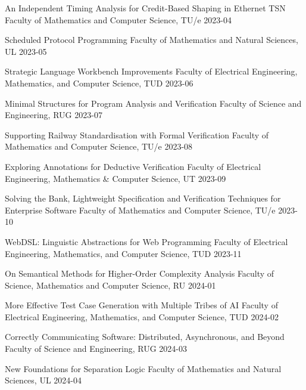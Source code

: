 \begin{multicols}{2}
         {An Independent Timing Analysis for Credit-Based Shaping in Ethernet TSN}
         {Faculty of Mathematics and Computer Science, TU/e}
         {2023-04}

         {Scheduled Protocol Programming}
         {Faculty of Mathematics and Natural Sciences, UL}
         {2023-05}

         {Strategic Language Workbench Improvements}
         {Faculty of Electrical Engineering, Mathematics, and Computer Science, TUD}
         {2023-06}

         {Minimal Structures for Program Analysis and Verification}
         {Faculty of Science and Engineering, RUG}
         {2023-07}

         {Supporting Railway Standardisation with Formal Verification}
         {Faculty of Mathematics and Computer Science, TU/e}
         {2023-08}

         {Exploring Annotations for Deductive Verification}
         {Faculty of Electrical Engineering, Mathematics \& Computer Science, UT}
         {2023-09}
		 
         {Solving the Bank, Lightweight Specification and Verification Techniques for Enterprise Software}
         {Faculty of Mathematics and Computer Science, TU/e}
         {2023-10}

         {WebDSL: Linguistic Abstractions for Web Programming}
         {Faculty of Electrical Engineering, Mathematics, and Computer Science, TUD}
         {2023-11}

         {On Semantical Methods for Higher-Order Complexity Analysis}
         {Faculty of Science, Mathematics and Computer Science, RU}
         {2024-01}

         {More Effective Test Case Generation with Multiple Tribes of AI}
         {Faculty of Electrical Engineering, Mathematics, and Computer Science, TUD}
         {2024-02}

         {Correctly Communicating Software: Distributed, Asynchronous, and Beyond}
         {Faculty of Science and Engineering, RUG}
         {2024-03}
         
         {New Foundations for Separation Logic}
         {Faculty of Mathematics and Natural Sciences, UL}
         {2024-04}
         

\end{multicols}
